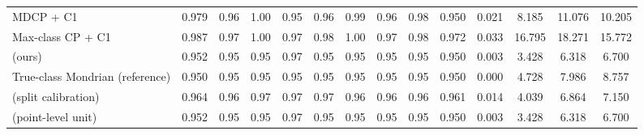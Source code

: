 \begin{table}[!htbp]
{\begin{tabular}{lccccccccccccc}
MDCP + C1 & 0.979 & 0.96 & 1.00 & 0.95 & 0.96 & 0.99 & 0.96 & 0.98 & 0.950 & 0.021 & 8.185 & 11.076 & 10.205 \\
Max-class CP + C1 & 0.987 & 0.97 & 1.00 & 0.97 & 0.98 & 1.00 & 0.97 & 0.98 & 0.972 & 0.033 & 16.795 & 18.271 & 15.772 \\
\gamut{} (ours) & 0.952 & 0.95 & 0.95 & 0.97 & 0.95 & 0.95 & 0.95 & 0.95 & 0.950 & 0.003 & 3.428 & 6.318 & 6.700 \\
True-class Mondrian (reference) & 0.950 & 0.95 & 0.95 & 0.95 & 0.95 & 0.95 & 0.95 & 0.95 & 0.950 & 0.000 & 4.728 & 7.986 & 8.757 \\
\gamut{} (split calibration) & 0.964 & 0.96 & 0.97 & 0.97 & 0.97 & 0.96 & 0.96 & 0.96 & 0.961 & 0.014 & 4.039 & 6.864 & 7.150 \\
\gamut{} (point-level unit) & 0.952 & 0.95 & 0.95 & 0.97 & 0.95 & 0.95 & 0.95 & 0.95 & 0.950 & 0.003 & 3.428 & 6.318 & 6.700 \\
\bottomrule
\end{tabular}}
\end{table}
\FloatBarrier

